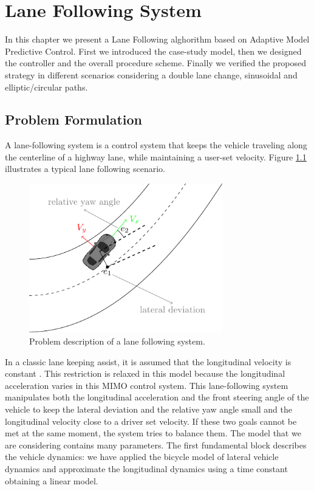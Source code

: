 \chapter{Lane Following System}
In this chapter we present a Lane Following alghorithm based on Adaptive Model Predictive Control. First we introduced the case-study model, then we designed the controller and the overall procedure scheme. Finally we verified the proposed strategy in different scenarios considering a double lane change, sinusoidal and elliptic/circular paths.
\section{Problem Formulation}
A lane-following system is a control system that keeps the vehicle traveling along the centerline of a highway lane, while maintaining a user-set velocity. Figure \ref{fig:laneFollowing} illustrates a typical lane following scenario.
\begin{figure}[!h]
	\centering
	\includegraphics[width=0.75\textwidth]{./figure/laneFollowing/laneFollowing.pdf}
	\caption{Problem description of a lane following system.}
	\label{fig:laneFollowing}
\end{figure}

In a classic lane keeping assist, it is assumed that the longitudinal velocity is constant \cite{Adaptive_Mpc_Lane_keeping_borelli}. This restriction is relaxed in this model because the longitudinal acceleration varies in this MIMO control system. This lane-following system manipulates both the longitudinal acceleration and the front steering angle of the vehicle to keep the lateral deviation and the relative yaw angle small and the longitudinal velocity close to a driver set velocity. If these two goals cannot be met at the same moment, the system tries to balance them. The model that we are considering contains many parameters. The first fundamental block describes the vehicle dynamics: we have applied the bicycle model of lateral vehicle dynamics and approximate the longitudinal dynamics using a time constant obtaining  a linear model.

